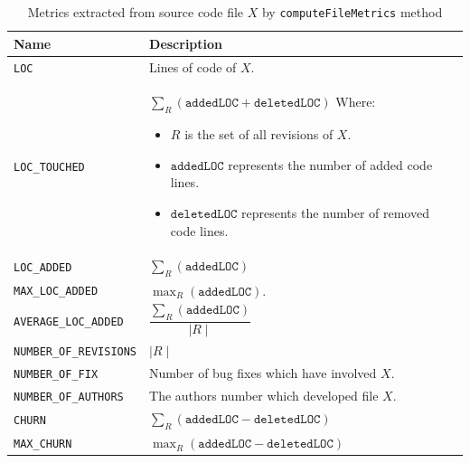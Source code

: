 \documentclass[sigconf]{acmart}
\begin{document}
\begin{table}
\caption{Metrics extracted from source code file $X$ by \texttt{compute\-File\-Metrics} method}
\label{metrics}
\begin{tabular}{l|p{4.3cm}}
\toprule
\textbf{Name} & \textbf{Description} \\
\midrule

\texttt{LOC} & Lines of code of $X$. 

\\

\texttt{LOC\_TOUCHED} & $\sum_R (\texttt{addedLOC} + \texttt{deletedLOC})$ \newline Where: 

\begin{itemize}
\item $R$ is the set of all revisions of $X$.
\item $\texttt{addedLOC}$ represents the number of added code lines.
\item $\texttt{deletedLOC}$ represents the number of removed code lines.
\end{itemize}

\\

\texttt{LOC\_ADDED} & $\sum_R (\texttt{addedLOC})$

\\

\texttt{MAX\_LOC\_ADDED} & $\max_R (\texttt{addedLOC})$.

\\
    
\texttt{AVERAGE\_LOC\_ADDED} & $\dfrac{\sum_R (\texttt{addedLOC})}{\mid R \mid}$

\\

\texttt{NUMBER\_OF\_REVISIONS} & $\mid R \mid$ 

\\

\texttt{NUMBER\_OF\_FIX} & Number of bug fixes which have involved $X$.

\\

\texttt{NUMBER\_OF\_AUTHORS} & The authors number which developed file $X$.

\\

\texttt{CHURN} & $\sum_R (\texttt{addedLOC} - \texttt{deletedLOC})$

\\

\texttt{MAX\_CHURN} & $\max_R (\texttt{addedLOC} - \texttt{deletedLOC})$


\end{tabular}
\end{table}
\end{document}
